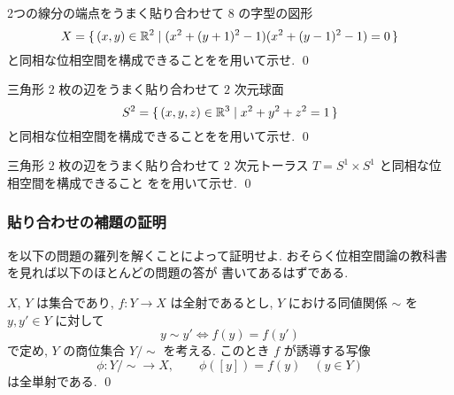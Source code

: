 \documentclass[12pt,twoside]{jarticle}
\begin{document}
\begin{question}
  2つの線分の端点をうまく貼り合わせて $8$ の字型の図形
  \begin{equation*}
    X = \{\, (x,y)\in{\mathbb R}^2 \mid (x^2+(y+1)^2-1)(x^2+(y-1)^2-1)=0 \,\}
  \end{equation*}
  と同相な位相空間を構成できることをを用いて示せ.
  \qed
\end{question}

\begin{question}
  三角形 $2$ 枚の辺をうまく貼り合わせて $2$ 次元球面
  \begin{equation*}
    S^2 = \{\, (x,y,z)\in{\mathbb R}^3 \mid x^2+y^2+z^2=1 \,\}
  \end{equation*}
  と同相な位相空間を構成できることをを用いて示せ.
  \qed
\end{question}

\begin{question}
  三角形 $2$ 枚の辺をうまく貼り合わせて $2$ 次元トーラス
  $T=S^1\times S^1$ と同相な位相空間を構成できること
  をを用いて示せ.
  \qed
\end{question}



\subsubsection{貼り合わせの補題の証明}
\label{sec:hariawase-proof}

を以下の問題の羅列を解くことによって証明せよ.
おそらく位相空間論の教科書を見れば以下のほとんどの問題の答が
書いてあるはずである.

\begin{question}
  $X$, $Y$ は集合であり, $f:Y\to X$ は全射であるとし,
  $Y$ における同値関係 $\sim$ を $y,y'\in Y$ に対して
  \begin{equation*}
    y\sim y' \iff f(y) = f(y')
  \end{equation*}
  で定め, $Y$ の商位集合 $Y/{\sim}$ を考える.
  このとき $f$ が誘導する写像
  \begin{equation*}
  \phi: Y/{\sim} \to X, \qquad 
  \phi([y])=f(y)\quad (y\in Y)   
  \end{equation*}
  は全単射である.
  \qed
\end{question}
\end{document}
